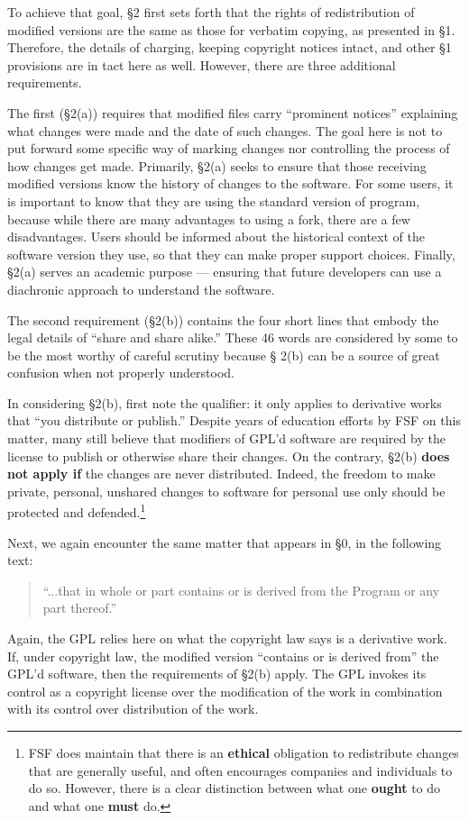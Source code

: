 \documentclass[11pt, letterpaper]{book}
\begin{document}
To achieve that goal, \S 2 first sets forth that the rights of
redistribution of modified versions are the same as those for verbatim
copying, as presented in \S 1. Therefore, the details of charging,
keeping copyright notices intact, and other \S 1 provisions are in tact
here as well. However, there are three additional requirements.

The first (\S 2(a)) requires that modified files carry ``prominent
notices'' explaining what changes were made and the date of such
changes. The goal here is not to put forward some specific way of
marking changes nor controlling the process of how changes get made.
Primarily, \S 2(a) seeks to ensure that those receiving modified
versions know the history of changes to the software. For some users,
it is important to know that they are using the standard version of
program, because while there are many advantages to using a fork,
there are a few disadvantages. Users should be informed about the
historical context of the software version they use, so that they can
make proper support choices. Finally, \S 2(a) serves an academic
purpose --- ensuring that future developers can use a diachronic
approach to understand the software.

\medskip

The second requirement (\S 2(b)) contains the four short lines that embody
the legal details of ``share and share alike.''  These 46 words are
considered by some to be the most worthy of careful scrutiny because \S
2(b) can be a source of great confusion when not properly understood.

In considering \S 2(b), first note the qualifier: it only applies to
derivative works that ``you distribute or publish.''  Despite years of
education efforts by FSF on this matter, many still believe that modifiers
of GPL'd software are required by the license to publish or otherwise
share their changes. On the contrary, \S 2(b) {\bf does not apply if} the
changes are never distributed. Indeed, the freedom to make private,
personal, unshared changes to software for personal use only should be
protected and defended.\footnote{FSF does maintain that there is an {\bf
    ethical} obligation to redistribute changes that are generally useful,
  and often encourages companies and individuals to do so. However, there
  is a clear distinction between what one {\bf ought} to do and what one
  {\bf must} do.}

Next, we again encounter the same matter that appears in \S 0, in the
following text:
\begin{quote}
``...that in whole or part contains or is derived from the Program or any part thereof.''
\end{quote}
Again, the GPL relies here on what the copyright law says is a derivative
work. If, under copyright law, the modified version ``contains or is
derived from'' the GPL'd software, then the requirements of \S 2(b)
apply. The GPL invokes its control as a copyright license over the
modification of the work in combination with its control over distribution
of the work.
\end{document}
